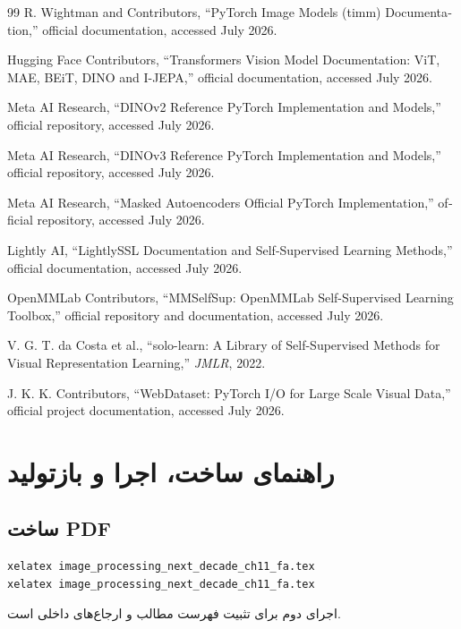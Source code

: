 \documentclass[12pt,openany,oneside]{book}
\begin{document}
\begin{latin}
\begin{thebibliography}{99}
R. Wightman and Contributors,
``PyTorch Image Models (timm) Documentation,''
official documentation, accessed July 2026.

Hugging Face Contributors,
``Transformers Vision Model Documentation: ViT, MAE, BEiT, DINO and I-JEPA,''
official documentation, accessed July 2026.

Meta AI Research,
``DINOv2 Reference PyTorch Implementation and Models,''
official repository, accessed July 2026.

Meta AI Research,
``DINOv3 Reference PyTorch Implementation and Models,''
official repository, accessed July 2026.

Meta AI Research,
``Masked Autoencoders Official PyTorch Implementation,''
official repository, accessed July 2026.

Lightly AI,
``LightlySSL Documentation and Self-Supervised Learning Methods,''
official documentation, accessed July 2026.

OpenMMLab Contributors,
``MMSelfSup: OpenMMLab Self-Supervised Learning Toolbox,''
official repository and documentation, accessed July 2026.

V. G. T. da Costa et al.,
``solo-learn: A Library of Self-Supervised Methods for Visual Representation Learning,''
\emph{JMLR}, 2022.

J. K. K. Contributors,
``WebDataset: PyTorch I/O for Large Scale Visual Data,''
official project documentation, accessed July 2026.

\end{thebibliography}
\end{latin}

\appendix
\chapter{راهنمای ساخت، اجرا و بازتولید}
\section{ساخت PDF}
\begin{latin}
\begin{lstlisting}
xelatex image_processing_next_decade_ch11_fa.tex
xelatex image_processing_next_decade_ch11_fa.tex
\end{lstlisting}
\end{latin}
اجرای دوم برای تثبیت فهرست مطالب و ارجاع‌های داخلی است.
\end{document}
